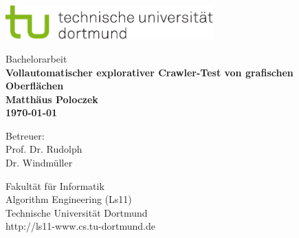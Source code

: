 \begin{titlepage}
\vspace*{-2cm}
\newlength{\links}
\setlength{\links}{-1.5cm}
\sf
\LARGE

\hspace*{\links}
\begin{minipage}{12.5cm}
\includegraphics[width=8cm]{bilder/tulogo-rgb}
\end{minipage}

\vspace*{4cm}

\hspace*{\links}
\hspace*{-0.2cm}
\begin{minipage}{9cm}
\large
\begin{center}
{\Large Bachelorarbeit} \\
\vspace*{1cm}
\bf{ Vollautomatischer explorativer Crawler-Test von grafischen Oberflächen } \\
\vspace*{1cm}
Matthäus Poloczek\\
\today
\end{center}
\end{minipage}

\vspace*{5.5cm}

\hspace*{\links}

\vspace*{1.5cm}

\vspace*{.6cm}

\hspace*{\links}
\begin{minipage}[b]{5cm}
\normalsize
\raggedright
Betreuer: \\
Prof. Dr. Rudolph \\
Dr. Windmüller \\
\end{minipage}

\vspace*{2.5cm}
\hspace*{\links}
\begin{minipage}[b]{8cm}
\normalsize
\raggedright
Fakultät für Informatik\\
Algorithm Engineering (Ls11)\\
Technische Universität Dortmund \\
http://ls11-www.cs.tu-dortmund.de
\end{minipage}


\end{titlepage}
